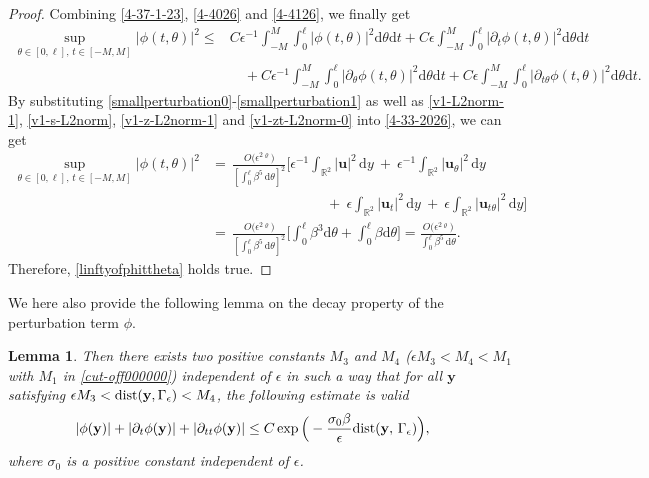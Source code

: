 \documentclass[10pt, reqno]{amsart}
\numberwithin{equation}{section}
\newtheorem{lemma}[theorem]{Lemma}
\theoremstyle{definition}
\newcommand{\e}{\epsilon}
\def\p{\partial}
\begin{document}
{{\begin{proof}
Combining \eqref{4-37-1-23}, \eqref{4-4026} and \eqref{4-4126}, we finally get
\begin{align}  \label{4-33-2026}
\sup_{\theta \in [0, \ell],\, t\in [-M, M]}  |\phi (t, \theta)|^2
 \leq&  C \e^{-1}  \int_{-M}^{M}   \int_0^{\ell} |\phi(t, \theta)|^2 {\mathrm d} \theta {\mathrm d} t+ C\e  \int_{-M}^{M}  \int_0^{\ell} |\p_t\phi(t, \theta)|^2 {\mathrm d} \theta{\mathrm d} t
  \nonumber
    \\[2mm]
  & \quad +   C \e^{-1}  \int_{-M}^{M}   \int_0^{\ell} |\p_{\theta} \phi(t, \theta)|^2 {\mathrm d} \theta {\mathrm d} t+ C\e  \int_{-M}^{M}  \int_0^{\ell} |\p_{t\theta} \phi(t, \theta)|^2 {\mathrm d} \theta{\mathrm d} t.
\end{align}
By substituting \eqref{smallperturbation0}-\eqref{smallperturbation1}
as well as \eqref{v1-L2norm-1}, \eqref{v1-s-L2norm}, \eqref{v1-z-L2norm-1} and \eqref{v1-zt-L2norm-0} into \eqref{4-33-2026}, we can get
\begin{align*}
 \sup_{\theta \in [0, \ell],\, t\in [-M, M]}  |\phi (t, \theta)|^2
&   = \,
\frac{O\big(\epsilon^{2\varrho}\big)}{\left[\displaystyle\int_0^{\ell}\beta^5\,{\mathrm d}\theta \right]^2}
\Bigg[ \e^{-1}  \int_{{\mathbb R}^2} |{\mathbf u}|^2 \,{\mathrm d} y
\ +\
\e^{-1}   \int_{{\mathbb R}^2} |{\mathbf u}_{\theta}|^2 \,{\mathrm d} y
      \nonumber
    \\[2mm]
    & \qquad\qquad\qquad\qquad
\ +\  \e  \int_{{\mathbb R}^2} |{\mathbf u}_t|^2 \,{\mathrm d} y
\ +\ \e \int_{{\mathbb R}^2} |{\mathbf u}_{t\theta}|^2 \,{\mathrm d} y\Bigg]
           \nonumber
    \\[2mm]
    & =\,  \frac{O\big(\epsilon^{2\varrho}\big)}{\left[\displaystyle\int_0^{\ell}\beta^5\,{\mathrm d}\theta \right]^2} \Bigg[ \int_0^{\ell} \beta^3 {\mathrm d}\theta +   \int_0^{\ell}\beta {\mathrm d}\theta \Bigg]
    = \frac{O\big(\epsilon^{2\varrho}\big)}{\displaystyle\int_0^{\ell}\beta^5\,{\mathrm d}\theta}.
\end{align*}
Therefore, \eqref{linftyofphittheta}  holds true.
\end{proof}


We here also provide the following lemma on the decay property of the perturbation term $\phi$.

\begin{lemma}\label{Lemma4.2}
 Then there exists two positive constants $M_3$ and $M_4$ ($\e M_3<M_4<M_1$ with $M_1$ in \eqref{cut-off000000}) independent of $\epsilon$ in such a way that
 for all ${\mathbf y}$ satisfying $\e M_3<{\mathrm{dist}} ({\bf y}, \Gamma_\epsilon) <M_4$,
 the following estimate is valid
\begin{align}
 &| \phi({\bf y}) | + | \p_t \phi({\bf y})| + | \p_{tt} \phi({\bf y}) |
 \leq
 C\exp {\Big(-\frac{\sigma_0\beta}{\epsilon}{\mathrm{dist}} ({\bf y}, \, \Gamma_\epsilon)\Big)},
 \label{estimateforphi}
\end{align}
where $\sigma_0$ is a positive constant independent of $\epsilon$.
\end{lemma}

}}
\end{document}
